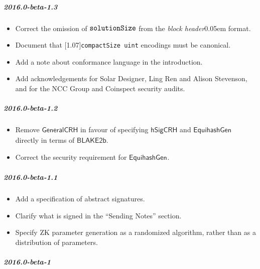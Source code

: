 \documentclass{article}
\let\oldtexttt\texttt
\let\oldmathtt\mathtt
\renewcommand{\texttt}[1]{\scalebox{1.02}[1.07]{\oldtexttt{#1}}}
\renewcommand{\mathtt}[1]{\scalebox{1.02}[1.07]{$\oldmathtt{#1}$}}
\newcommand{\introlist}{\needspace{15ex}}
\newcommand{\term}[1]{\textsl{#1}\kern 0.05em\xspace}
\newcommand{\blockHeader}{\term{block header}}
\newcommand{\hSigCRH}{\mathsf{hSigCRH}}
\newcommand{\EquihashGen}[1]{\mathsf{EquihashGen}_{#1}}
\newcommand{\BlakeGeneric}{\mathsf{BLAKE2b}}
\newcommand{\type}[1]{\texttt{#1}}
\newcommand{\compactSize}{\type{compactSize uint}}
\newcommand{\solutionSize}{\mathtt{solutionSize}}
\begin{document}
\introlist
\subparagraph{2016.0-beta-1.3}

\begin{itemize}
    \item Correct the omission of $\solutionSize$ from the \blockHeader format.
    \item Document that \compactSize{} encodings must be canonical.
    \item Add a note about conformance language in the introduction.
    \item Add acknowledgements for Solar Designer, Ling Ren and Alison Stevenson,
          and for the NCC Group and Coinspect security audits.
\end{itemize}

\introlist
\subparagraph{2016.0-beta-1.2}

\begin{itemize}
    \item Remove $\mathsf{GeneralCRH}$ in favour of specifying $\hSigCRH$ and
          $\EquihashGen{}$ directly in terms of $\BlakeGeneric$.
    \item Correct the security requirement for $\EquihashGen{}$.
\end{itemize}

\introlist
\subparagraph{2016.0-beta-1.1}

\begin{itemize}
    \item Add a specification of abstract signatures.
    \item Clarify what is signed in the ``Sending Notes'' section.
    \item Specify ZK parameter generation as a randomized algorithm, rather
          than as a distribution of parameters.
\end{itemize}

\introlist
\subparagraph{2016.0-beta-1}
\end{document}
